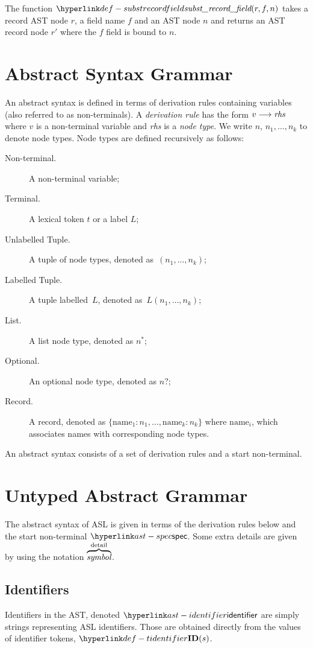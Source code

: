 \hypertarget{def-substrecordfield}{}
The function $\substrecordfield(r, f, n)$ takes a record AST node $r$, a field name $f$ and an AST node $n$
and returns an AST record node $r'$ where the $f$ field is bound to $n$.

\section{Abstract Syntax Grammar\label{sec:AbstractSyntaxGrammar}}

An abstract syntax is defined in terms of derivation rules containing variables (also referred to as non-terminals).
%
A \emph{derivation rule} has the form $v \longrightarrow \textit{rhs}$ where $v$ is a non-terminal variable and \textit{rhs} is a \emph{node type}. We write $n$, $n_1,\ldots,n_k$ to denote node types.
%
Node types are defined recursively as follows:
\begin{description}
\item[Non-terminal.] A non-terminal variable;
\item[Terminal.] A lexical token $t$ or a label $L$;
\item[Unlabelled Tuple.] A tuple of node types, denoted as~$(n_1,\ldots,n_k)$;
\item[Labelled Tuple.] A tuple labelled~$L$, denoted as~$L(n_1,\ldots,n_k)$;
\item[List.] A list node type, denoted as $n^{*}$;
\item[Optional.] An optional node type, denoted as $n?$;
\item[Record.] A record, denoted as $\{\text{name}_1 : n_1,\ldots,\text{name}_k : n_k\}$ where $\text{name}_i$, which associates names with corresponding node types.
\end{description}

\newpage

An abstract syntax consists of a set of derivation rules and a start non-terminal.

\section{Untyped Abstract Grammar\label{sec:UntypedAbstractGrammar}}

The abstract syntax of ASL is given in terms of the derivation rules below and the start non-terminal $\spec$.
%
Some extra details are given by using the notation $\overbrace{\textit{symbol}}^{\text{detail}}$.

\subsection{Identifiers \label{sec:Identifiers}}
\hypertarget{ast-identifier}{}
Identifiers in the AST, denoted $\identifier$ are simply strings representing ASL identifiers.
Those are obtained directly from the values of identifier tokens, $\Tidentifier(s)$.

